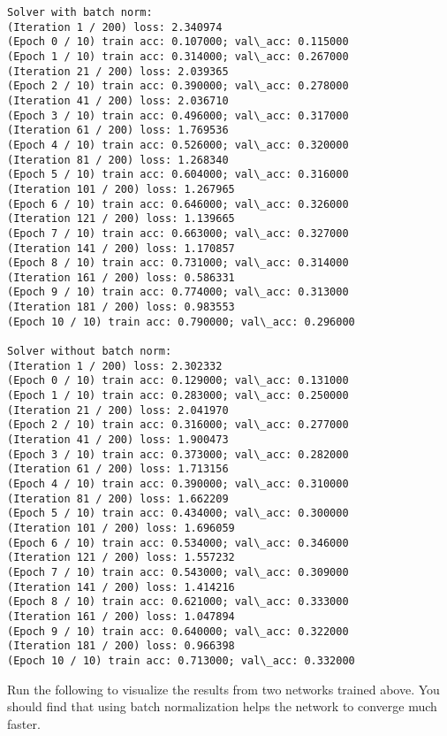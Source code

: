 \documentclass[11pt]{article}
\begin{document}
    \begin{Verbatim}[commandchars=\\\{\}]
Solver with batch norm:
(Iteration 1 / 200) loss: 2.340974
(Epoch 0 / 10) train acc: 0.107000; val\_acc: 0.115000
(Epoch 1 / 10) train acc: 0.314000; val\_acc: 0.267000
(Iteration 21 / 200) loss: 2.039365
(Epoch 2 / 10) train acc: 0.390000; val\_acc: 0.278000
(Iteration 41 / 200) loss: 2.036710
(Epoch 3 / 10) train acc: 0.496000; val\_acc: 0.317000
(Iteration 61 / 200) loss: 1.769536
(Epoch 4 / 10) train acc: 0.526000; val\_acc: 0.320000
(Iteration 81 / 200) loss: 1.268340
(Epoch 5 / 10) train acc: 0.604000; val\_acc: 0.316000
(Iteration 101 / 200) loss: 1.267965
(Epoch 6 / 10) train acc: 0.646000; val\_acc: 0.326000
(Iteration 121 / 200) loss: 1.139665
(Epoch 7 / 10) train acc: 0.663000; val\_acc: 0.327000
(Iteration 141 / 200) loss: 1.170857
(Epoch 8 / 10) train acc: 0.731000; val\_acc: 0.314000
(Iteration 161 / 200) loss: 0.586331
(Epoch 9 / 10) train acc: 0.774000; val\_acc: 0.313000
(Iteration 181 / 200) loss: 0.983553
(Epoch 10 / 10) train acc: 0.790000; val\_acc: 0.296000

Solver without batch norm:
(Iteration 1 / 200) loss: 2.302332
(Epoch 0 / 10) train acc: 0.129000; val\_acc: 0.131000
(Epoch 1 / 10) train acc: 0.283000; val\_acc: 0.250000
(Iteration 21 / 200) loss: 2.041970
(Epoch 2 / 10) train acc: 0.316000; val\_acc: 0.277000
(Iteration 41 / 200) loss: 1.900473
(Epoch 3 / 10) train acc: 0.373000; val\_acc: 0.282000
(Iteration 61 / 200) loss: 1.713156
(Epoch 4 / 10) train acc: 0.390000; val\_acc: 0.310000
(Iteration 81 / 200) loss: 1.662209
(Epoch 5 / 10) train acc: 0.434000; val\_acc: 0.300000
(Iteration 101 / 200) loss: 1.696059
(Epoch 6 / 10) train acc: 0.534000; val\_acc: 0.346000
(Iteration 121 / 200) loss: 1.557232
(Epoch 7 / 10) train acc: 0.543000; val\_acc: 0.309000
(Iteration 141 / 200) loss: 1.414216
(Epoch 8 / 10) train acc: 0.621000; val\_acc: 0.333000
(Iteration 161 / 200) loss: 1.047894
(Epoch 9 / 10) train acc: 0.640000; val\_acc: 0.322000
(Iteration 181 / 200) loss: 0.966398
(Epoch 10 / 10) train acc: 0.713000; val\_acc: 0.332000
    \end{Verbatim}

    Run the following to visualize the results from two networks trained
above. You should find that using batch normalization helps the network
to converge much faster.
\end{document}
